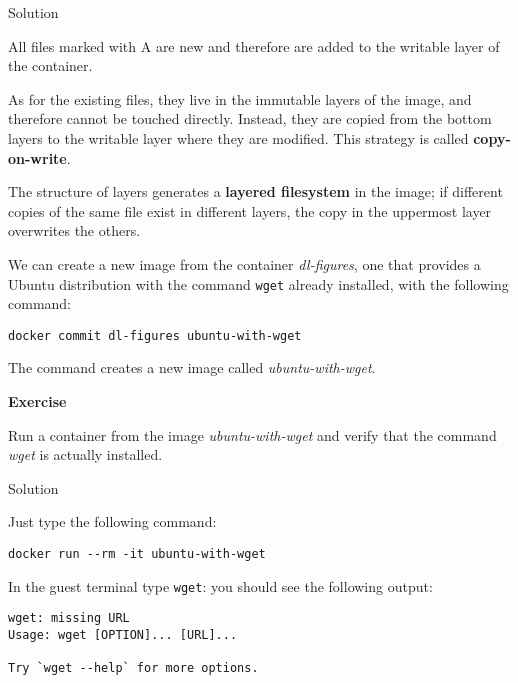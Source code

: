 \documentclass[
]{article}
\newenvironment{infobox}[1]
  {
  \begin{itemize}
  \renewcommand{\labelitemi}{
    \raisebox{-.7\height}[0pt][0pt]{
      
    }
  }
  \setlength{\fboxsep}{1em}
  \begin{whitebox}
  \item
  }
  {
  \end{whitebox}
  \end{itemize}
  }
\theoremstyle{definition}
\theoremstyle{definition}
\theoremstyle{definition}
\theoremstyle{remark}
\let\BeginKnitrBlock\begin \let\EndKnitrBlock\end
\begin{document}
Solution

\begin{infobox}{exercisebox}

All files marked with A are new and therefore are
added to the writable layer of the container.

As for the existing files, they live in the immutable layers
of the image, and therefore cannot be touched directly.
Instead, they are copied from the bottom layers to the writable layer where
they are modified.
This strategy is called \textbf{copy-on-write}.

The structure of layers generates a \textbf{layered filesystem} in the image;
if different copies of the same file exist in different layers,
the copy in the uppermost layer
overwrites the others.

\end{infobox}

We can create a new image from the container \emph{dl-figures}, one that provides
a Ubuntu distribution with the command \texttt{wget} already installed,
with the following command:

\begin{verbatim}
docker commit dl-figures ubuntu-with-wget
\end{verbatim}

The command creates a new image called \emph{ubuntu-with-wget}.

\begin{infobox}{exercisebox}

\textbf{Exercise}

\BeginKnitrBlock{exercise}
\protect\hypertarget{exr:unnamed-chunk-14}{}{\label{exr:unnamed-chunk-14} }Run a container from the image \emph{ubuntu-with-wget} and verify that the command
\emph{wget} is actually installed.
\EndKnitrBlock{exercise}

\end{infobox}

Solution

\begin{infobox}{exercisebox}

Just type the following command:

\begin{verbatim}
docker run --rm -it ubuntu-with-wget
\end{verbatim}

In the guest terminal type \texttt{wget}: you should see the
following output:

\begin{verbatim}
wget: missing URL
Usage: wget [OPTION]... [URL]...

Try `wget --help` for more options.
\end{verbatim}

\end{infobox}
\end{document}
